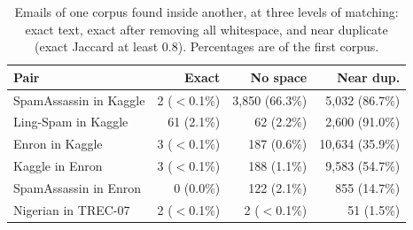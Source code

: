 \begin{table}[t]
\caption{Emails of one corpus found inside another, at three levels of matching: exact text, exact after removing all whitespace, and near duplicate (exact Jaccard at least 0.8). Percentages are of the first corpus.}
\label{tab:overlap}
\centering\footnotesize
\setlength{\tabcolsep}{2pt}
\begin{tabular}{lrrr}
\toprule
Pair & Exact & No space & Near dup. \\
\midrule
SpamAssassin in Kaggle & 2 ($<$0.1\%) & 3,850 (66.3\%) & 5,032 (86.7\%) \\
Ling-Spam in Kaggle & 61 (2.1\%) & 62 (2.2\%) & 2,600 (91.0\%) \\
Enron in Kaggle & 3 ($<$0.1\%) & 187 (0.6\%) & 10,634 (35.9\%) \\
Kaggle in Enron & 3 ($<$0.1\%) & 188 (1.1\%) & 9,583 (54.7\%) \\
SpamAssassin in Enron & 0 (0.0\%) & 122 (2.1\%) & 855 (14.7\%) \\
Nigerian in TREC-07 & 2 ($<$0.1\%) & 2 ($<$0.1\%) & 51 (1.5\%) \\
\bottomrule
\end{tabular}
\end{table}
